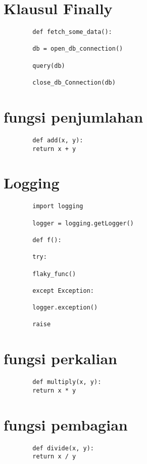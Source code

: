 \documentclass{article}
\begin{document}
	\section {Klausul Finally}
	\begin{lstlisting}
		def fetch_some_data():
		
		db = open_db_connection()
		
		query(db)
		
		close_db_Connection(db)
	\end{lstlisting}

	\section {fungsi penjumlahan}
	\begin{lstlisting}
		def add(x, y):
		return x + y
	\end{lstlisting}

	\section {Logging}
	\begin{lstlisting}
		import logging
		
		logger = logging.getLogger()
		
		def f():
		
		try:
		
		flaky_func()
		
		except Exception:
		
		logger.exception()
		
		raise
	\end{lstlisting}

	\section {fungsi perkalian}
	\begin{lstlisting}
		def multiply(x, y):
		return x * y
	\end{lstlisting}
	
	\section {fungsi pembagian}
	\begin{lstlisting}
		def divide(x, y):
		return x / y
	\end{lstlisting}
\end{document}
